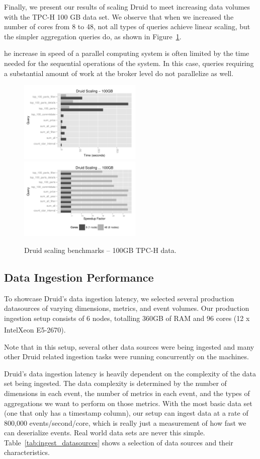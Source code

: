 \documentclass{vldb}
\begin{document}
Finally, we present our results of scaling Druid to meet increasing data
volumes with the TPC-H 100 GB data set. We observe that when we
increased the number of cores from 8 to 48, not all types of queries
achieve linear scaling, but the simpler aggregation queries do,
as shown in Figure~\ref{fig:tpch_scaling}.

he increase in speed of a parallel computing system is often limited by the
time needed for the sequential operations of the system. In this case, queries
requiring a substantial amount of work at the broker level do not parallelize as
well.

\begin{figure}
\centering
\includegraphics[width = 2.3in]{tpch_scaling}
\includegraphics[width = 2.3in]{tpch_scaling_factor}
\caption{Druid scaling benchmarks -- 100GB TPC-H data.}
\label{fig:tpch_scaling}
\end{figure}

\subsection{Data Ingestion Performance}
To showcase Druid's data ingestion latency, we selected several production
datasources of varying dimensions, metrics, and event volumes. Our production
ingestion setup consists of 6 nodes, totalling 360GB of RAM and 96 cores (12 x
Intel\textsuperscript\textregistered Xeon\textsuperscript\textregistered
E5-2670).

Note that in this setup, several other data sources were being ingested and
many other Druid related ingestion tasks were running concurrently on the
machines.

Druid's data ingestion latency is heavily dependent on the complexity of the
data set being ingested. The data complexity is determined by the number of
dimensions in each event, the number of metrics in each event, and the types of
aggregations we want to perform on those metrics. With the most basic data set
(one that only has a timestamp column), our setup can ingest data at a rate of
800,000 events/second/core, which is really just a measurement of how fast we
can deserialize events. Real world data sets are never this simple.
Table~\ref{tab:ingest_datasources} shows a selection of data sources and their
characteristics.
\end{document}
